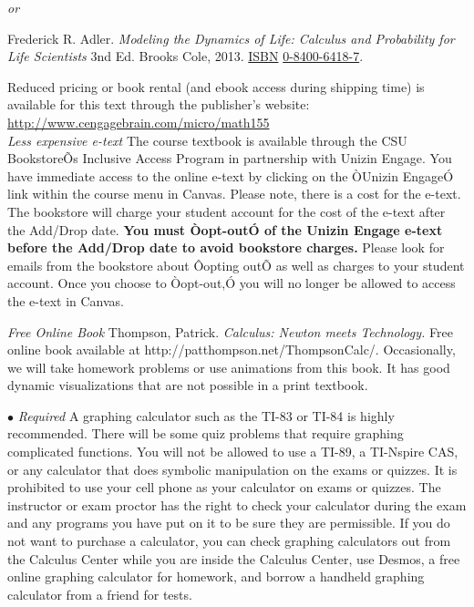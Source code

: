 \documentclass[11pt]{article}
\begin{document}
 \textit{or}

\vspace{1mm}
\noindent Frederick R. Adler. \textit{Modeling the Dynamics of Life: Calculus and Probability for Life Scientists} 3nd Ed. Brooks Cole, 2013.  \url{ISBN} \url{0-8400-6418-7}.

\vspace{1mm}

Reduced pricing or book rental (and ebook access during shipping time) is available for this text through the publisher's website:  \url{http://www.cengagebrain.com/micro/math155} \\

\textit{Less expensive e-text} The course textbook is available through the CSU BookstoreÕs Inclusive Access Program in partnership with Unizin Engage.  You have immediate access to the online e-text by clicking on the ÒUnizin EngageÓ link within the course menu in Canvas. Please note, there is a cost for the e-text. The bookstore will charge your student account for the cost of the e-text after the Add/Drop date. \textbf{ You must Òopt-outÓ of the Unizin Engage e-text before the Add/Drop date to avoid bookstore charges.} Please look for emails from the bookstore about Ôopting outÕ as well as charges to your student account. Once you choose to Òopt-out,Ó you will no longer be allowed to access the e-text in Canvas.

\vspace{10mm}

\noindent  \textit{Free Online Book} Thompson, Patrick. \textit{Calculus: Newton meets Technology.} Free online book available at http://patthompson.net/ThompsonCalc/. Occasionally, we will take homework problems or use animations from this book. It has good dynamic visualizations that are not possible in a print textbook.\vspace{10mm}

\noindent $\bullet$ \textit{Required} A graphing calculator such as the TI-83 or TI-84 is highly recommended.  There will be some quiz problems that require graphing complicated functions. You will not be allowed to use a TI-89, a TI-Nspire CAS, or any calculator that does symbolic manipulation on the exams or quizzes. It is prohibited to use your cell phone as your calculator on exams or quizzes. The instructor or exam proctor has the right to check your calculator during the exam and any programs you have put on it to be sure they are permissible. If you do not want to purchase a calculator, you can check graphing calculators out from the Calculus Center while you are inside the Calculus Center, use Desmos, a free online graphing calculator for homework, and borrow a handheld graphing calculator from a friend for tests. \\
\end{document}
